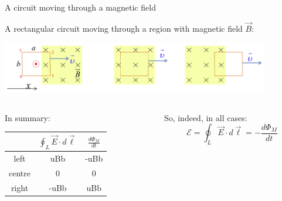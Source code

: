 \begin{frame}{A circuit moving through a magnetic field}

A rectangular circuit moving through a region with magnetic field $\vec{B}$:
\begin{center}
  \includegraphics[width=0.88\textwidth]{./images/schematics/circuit_moving_through_magnetic_field_all_3.png}
\end{center}

\begin{columns}
  \begin{column}{0.55\textwidth}
  In summary:
  {\small
    \setlength{\extrarowheight}{10pt}
    \setlength{\arraycolsep}{5pt}
    \begin{table}[H]
        \begin{tabular}{|c||c|c|}
        \hline
               & $\displaystyle \oint_{L} \vec{E} \cdot d\vec{\ell}$ & $\displaystyle \frac{d\Phi_{M}}{dt}$\\
        \hline
          left   &  uBb &  -uBb \\
          centre & 0    &  0   \\
          right  &  -uBb & uBb \\
        \hline
        \end{tabular}
    \end{table}
  }
  \end{column}
  \begin{column}{0.45\textwidth}
     So, indeed, in all cases:
     \begin{equation*}
       \mathcal{E} = \oint_{L} \vec{E} \cdot d\vec{\ell} = - \frac{d\Phi_{M}}{dt}
     \end{equation*}
  \end{column}
\end{columns}

\end{frame}

%
%
%

